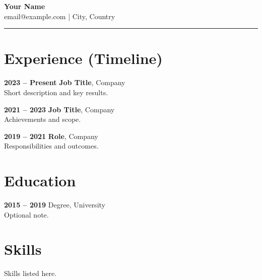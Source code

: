 \documentclass[11pt,a4paper]{article}
\begin{document}
\begin{center}
{\LARGE \textbf{Your Name}}\\[0.2em]
email@example.com \quad | \quad City, Country
\end{center}
\begin{flushright}\rule{2cm}{2.5cm}\end{flushright}
\vspace{0.6em}
\section*{Experience (Timeline)}

\textbf{2023 -- Present} \quad \textbf{Job Title}, Company \\
Short description and key results.

\vspace{0.3em}
\textbf{2021 -- 2023} \quad \textbf{Job Title}, Company \\
Achievements and scope.

\vspace{0.3em}
\textbf{2019 -- 2021} \quad \textbf{Role}, Company \\
Responsibilities and outcomes.

\vspace{0.5em}
\section*{Education}
\textbf{2015 -- 2019} \quad Degree, University \\
Optional note.

\section*{Skills}
Skills listed here.
\end{document}
